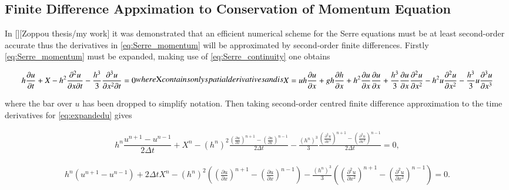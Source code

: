 \documentclass[SingleSpace,12pt,Proceedings]{Serre_ASCE}
\begin{document}
\subsection{Finite Difference Appximation to Conservation of Momentum Equation} 
In [][Zoppou thesis/my work] it was demonstrated that an efficient numerical scheme for the Serre equations must be at least second-order accurate thus the derivatives in \eqref{eq:Serre_momentum} will be approximated by second-order finite differences. Firstly \eqref{eq:Serre_momentum} must be expanded, making use of \eqref{eq:Serre_continuity} one obtains
\begin{linenomath*}
\begin{subequations}
\begin{gather}
h\dfrac{\partial u}{\partial t} + X - h^2\frac{\partial^2 u}{\partial x \partial t} - \frac{h^3}{3}\frac{\partial^3 u}{\partial x^2 \partial t}  =0 
\label{eq:expandedu}
\end{gather}
where $X$ contains only spatial derivatives and is
\begin{gather}
X = uh\frac{\partial u}{\partial x} + gh\frac{\partial h}{\partial x} + h^2\frac{\partial u}{\partial x}\frac{\partial u}{\partial x} + \frac{h^3}{3}\frac{\partial u}{\partial x}\frac{\partial^2 u}{\partial x^2} - h^2u\frac{\partial^2 u}{\partial x^2}- \frac{h^3}{3}u\frac{\partial^3 u}{\partial x^3}
\end{gather}
\end{subequations}
\end{linenomath*}
where the bar over $u$ has been dropped to simplify notation. Then taking second-order centred finite difference approximation to the time derivatives for \eqref{eq:expandedu} gives
\begin{linenomath*}
\begin{gather*}
h^{n}\dfrac{u^{n+1} - u^{n-1}}{2 \Delta t} + X^{n} - \left(h^{n}\right)^2\frac{ \left(\frac{\partial u}{\partial x}\right)^{n+1} - \left(\frac{\partial u}{\partial x}\right)^{n-1} }{2 \Delta t} - \frac{\left(h^{n}\right)^3}{3}\frac{ \left(\frac{\partial^2 u}{\partial x^2}\right)^{n+1} - \left(\frac{\partial^2 u}{\partial x^2}\right)^{n-1} }{2 \Delta t}  =0, 
\label{eq:expandedutdisc}
\end{gather*}
\end{linenomath*}
\begin{linenomath*}
\begin{gather*}
h^{n} \left(u^{n+1} - u^{n-1}\right) + 2\Delta tX^{n} - \left(h^{n}\right)^2 \left(\left(\frac{\partial u}{\partial x}\right)^{n+1} - \left(\frac{\partial u}{\partial x}\right)^{n-1}\right) - \frac{\left(h^{n}\right)^3}{3}\left(\left(\frac{\partial^2 u}{\partial x^2}\right)^{n+1} - \left(\frac{\partial^2 u}{\partial x^2}\right)^{n-1} \right)  =0. 
\label{eq:expandedutdisc1}
\end{gather*}
\end{linenomath*}
\end{document}
